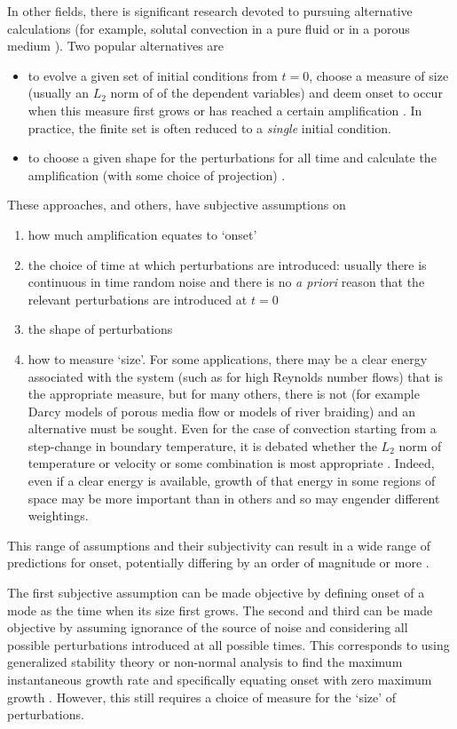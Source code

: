 \documentclass[letterpaper,prl,aps,reprint,superscriptaddress]{revtex4-1}
\begin{document}
In other fields, there is significant research devoted to pursuing alternative calculations (for example, solutal convection in a pure fluid or in a porous medium \cite{references}).  Two popular alternatives are
\begin{itemize}
\itemsep=0cm
\item to evolve a given set of initial conditions from $t=0$, choose a measure of size (usually an $L_2$ norm of of the dependent variables) and deem onset to occur when this measure first grows or has reached a certain amplification \cite{Foster,GreshoSani,EnnisKingPaterson,more}.  In practice, the finite set is often reduced to a \emph{single} initial condition.
\item to choose a given shape for the perturbations for all time and calculate the amplification (with some choice of projection) \cite{Ben,Riaz,more}.
\end{itemize}
These approaches, and others, have subjective assumptions on
\begin{enumerate}
\itemsep=0cm
\item how much amplification equates to `onset'
\item the choice of time at which perturbations are introduced: usually there is continuous in time random noise and there is no \emph{a priori} reason that the relevant perturbations are introduced at $t=0$ \cite{GreshoSani}
\item the shape of perturbations
\item how to measure `size'.  For some applications, there may be a clear energy associated with the system (such as for high Reynolds number flows) that is the appropriate measure, but for many others, there is not (for example Darcy models of porous media flow or models of river braiding) and an alternative must be sought.  Even for the case of convection starting from a step-change in boundary temperature, it is debated whether the $L_2$ norm of temperature or velocity or some combination is most appropriate \cite{GreshoSani}.  Indeed, even if a clear energy is available, growth of that energy in some regions of space may be more important than in others and so may engender different weightings.
\end{enumerate}
This range of assumptions and their subjectivity can result in a wide range of predictions for onset, potentially differing by an order of magnitude or more \cite{example}.

The first subjective assumption can be made objective by defining onset of a mode as the time when its size first grows.  The second and third can be made objective by assuming ignorance of the source of noise and considering all possible perturbations introduced at all possible times.  This corresponds to using generalized stability theory or non-normal analysis to find the maximum instantaneous growth rate and specifically equating onset with zero maximum growth \cite{FarrellIoannou,SlimRama10}.  However, this still requires a choice of measure for the `size' of perturbations.
\end{document}
